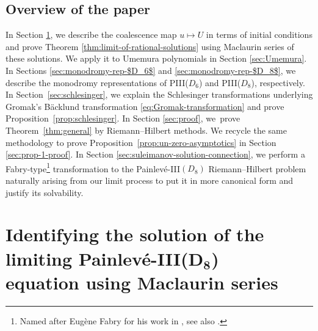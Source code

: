 \documentclass[pdftex]{sigma}
\numberwithin{equation}{section}
\begin{document}
\subsection{Overview of the paper} In Section \ref{sec:Frobenius-method}, we describe the coalescence map $u \mapsto U$ in terms of initial conditions and prove Theorem \ref{thm:limit-of-rational-solutions} using Maclaurin series of these solutions. We apply it to Umemura polynomials in Section \ref{sec:Umemura}. In Sections \ref{sec:monodromy-rep-$D_6$} and \ref{sec:monodromy-rep-$D_8$}, we describe the monodromy representations of PIII($D_6$) and PIII($D_8$), respectively. In Section~\ref{sec:schlesinger}, we explain the Schlesinger transformations underlying Gromak's B\"acklund transformation \eqref{eq:Gromak-transformation} and prove Proposition~\ref{prop:schlesinger}. In Section \ref{sec:proof}, we~prove Theorem~\ref{thm:general} by Riemann--Hilbert methods. We recycle the same methodology to prove Proposition~\ref{prop:un-zero-asymptotics} in Section \ref{sec:prop-1-proof}. In Section \ref{sec:suleimanov-solution-connection}, we perform a Fabry-type\footnote{Named after Eug\`ene Fabry for his work in \cite{fabry1885}, see also \cite[Chapter 17.53]{MR0010757}.} transformation to the Painlev\'e-III$(D_8)$ Riemann--Hilbert problem naturally arising from our limit process to put it in more canonical form and justify its solvability.


\section[Identifying the solution of the limiting Painlev\'e-III(D\_8) equation using Maclaurin series]{Identifying the solution of the limiting Painlev\'e-III($\boldsymbol{D_8}$)\\ equation using Maclaurin series}
\label{sec:Frobenius-method}
\end{document}
